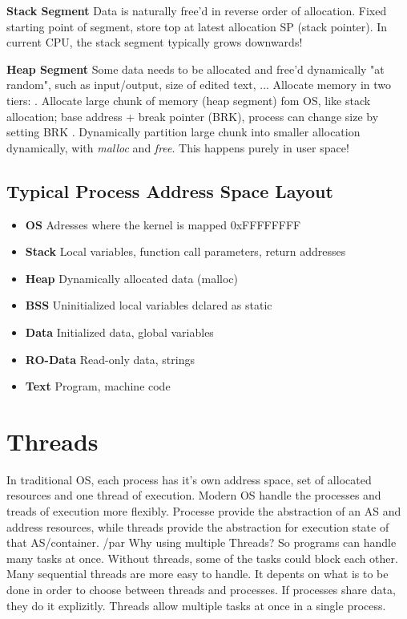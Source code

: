 \documentclass[11pt,a4paper]{article}
\begin{document}
	\textbf{Stack Segment} \newline
	Data is naturally free'd in reverse order of allocation. Fixed starting point of segment, store top at latest allocation SP (stack pointer). In current CPU, the stack segment typically grows downwards!	\newline
	
	\textbf{Heap Segment}
	Some data needs to be allocated and free'd dynamically "at random", such as input/output, size of edited text, ... \newline
	Allocate memory in two tiers: . Allocate large chunk of memory (heap segment) fom OS, like stack allocation; base address + break pointer (BRK), process can change size by setting BRK . Dynamically partition large chunk into smaller allocation dynamically, with \textit{malloc} and \textit{free}. This happens purely in user space!
	
	\subsection{Typical Process Address Space Layout}
	\begin{itemize}
		\item \textbf{OS}				\tab Adresses where the kernel is mapped 0xFFFFFFFF
		\item \textbf{Stack}		 	\tab Local variables, function call parameters, return addresses
		\item \textbf{Heap}				\tab Dynamically allocated data (malloc)
		\item \textbf{BSS}				\tab Uninitialized local variables dclared as static
		\item \textbf{Data}				\tab Initialized data, global variables
		\item \textbf{RO-Data}		\tab Read-only data, strings
		\item \textbf{Text}				\tab Program, machine code
	\end{itemize}


	\section{Threads}
	In traditional OS, each process has it's own address space, set of allocated resources and one thread of execution. \newline
	Modern OS handle the processes and treads of execution more flexibly. Processe provide the abstraction of an AS and address resources, while threads provide the abstraction for execution state of that AS/container. /par
	Why using multiple Threads? \newline
	So programs can handle many tasks at once. Without threads, some of the tasks could block each other. Many sequential threads are more easy to handle.
	It depents on what is to be done in order to choose between threads and processes. If processes share data, they do it explizitly. Threads allow multiple tasks at once in a single process.
	
\end{document}
